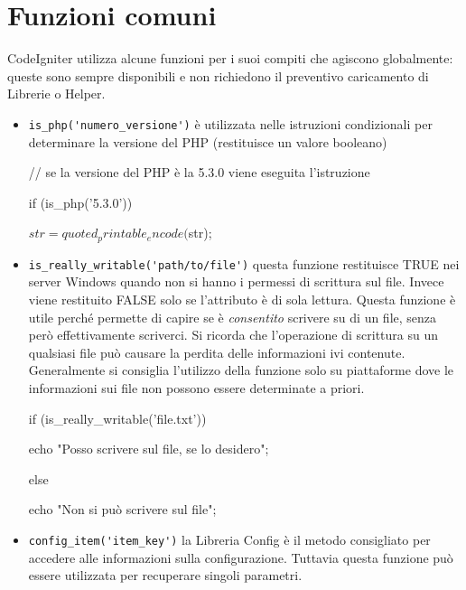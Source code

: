 \section{Funzioni comuni}
\label{cap:funzionicomuni}

CodeIgniter utilizza alcune funzioni per i suoi compiti che agiscono globalmente: queste sono sempre disponibili e non richiedono il preventivo caricamento di Librerie o Helper.

\begin{itemize}
\item \verb|is_php('numero_versione')| è utilizzata nelle istruzioni condizionali per determinare la versione del \ac{PHP} (restituisce un valore booleano)

\begin{code}
// se la versione del PHP è la 5.3.0 viene eseguita l'istruzione

if (is_php('5.3.0')) {

	$str = quoted_printable_encode($str);
	
}
\end{code}

\item \verb|is_really_writable('path/to/file')| questa funzione restituisce TRUE nei server Windows quando non si hanno i permessi di scrittura sul file. Invece viene restituito FALSE solo se l'attributo è di sola lettura. Questa funzione è utile perché permette di capire se è \emph{consentito} scrivere su di un file, senza però effettivamente scriverci. Si ricorda che l'operazione di scrittura su un qualsiasi file può causare la perdita delle informazioni ivi contenute. Generalmente si consiglia l'utilizzo della funzione solo su piattaforme dove le informazioni sui file non possono essere determinate a priori.

\begin{code}
if (is_really_writable('file.txt')) {

	echo "Posso scrivere sul file, se lo desidero";

}

else {

    echo "Non si può scrivere sul file";

}
\end{code}

\item \verb|config_item('item_key')| la Libreria Config è il metodo consigliato per accedere alle informazioni sulla configurazione. Tuttavia questa funzione può essere utilizzata per recuperare singoli parametri.


\end{itemize}
